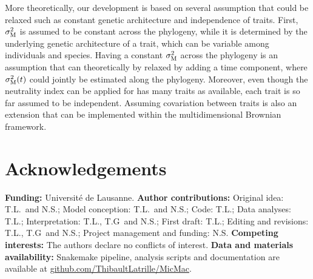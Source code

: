 \documentclass{article}
\begin{document}
More theoretically, our development is based on several assumption that could be relaxed such as constant genetic architecture and independence of traits.
First, $\sigma^2_{\text{M}}$ is assumed to be constant across the phylogeny, while it is determined by the underlying genetic architecture of a trait, which can be variable among individuals and species.
Having a constant $\sigma^2_{\text{M}}$ across the phylogeny is an assumption that can theoretically by relaxed by adding a time component\cite{arnold_understanding_2008, hohenlohe_mipod_2008}, where $\sigma^2_{\text{M}}(t)$ could jointly be estimated along the phylogeny\cite{kostikova_bridging_2016, gaboriau_multiplatform_2020}.
Moreover, even though the neutrality index can be applied for has many traits as available,  each trait is so far assumed to be independent.
Assuming covariation between traits is also an extension that can be implemented within the multidimensional Brownian framework\cite{huelsenbeck_detecting_2003,  lartillot_phylogenetic_2011,lartillot_joint_2012}.


\section*{Acknowledgements}
\label{sec:acknowledgment}
\textbf{Funding:}
Université de Lausanne.
\textbf{Author contributions:}
Original idea: T.L.\ and N.S.;
Model conception: T.L.\ and N.S.;
Code: T.L.;
Data analyses: T.L.;
Interpretation: T.L., T.G\ and N.S.;
First draft: T.L.;
Editing and revisions: T.L., T.G\ and N.S.;
Project management and funding: N.S\@.
\textbf{Competing interests:}
The authors declare no conflicts of interest.
\textbf{Data and materials availability:}
Snakemake pipeline, analysis scripts and documentation are available at \href{https://github.com/ThibaultLatrille/MicMac}{github.com/ThibaultLatrille/MicMac}.

\printbibliography
\end{document}
